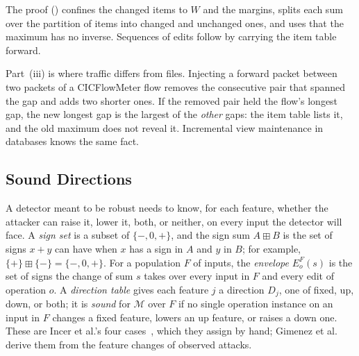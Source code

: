 \noindent The proof () confines the changed items to $W$ and the margins, splits each sum over the
partition of items into changed and unchanged ones, and uses that the maximum has no inverse. Sequences of edits
follow by carrying the item table forward.

Part~(iii) is where traffic differs from files. Injecting a forward packet between two packets of a CICFlowMeter flow
removes the consecutive pair that spanned the gap and adds two shorter ones. If the removed pair held the flow's
longest gap, the new longest gap is the largest of the \emph{other} gaps: the item table lists it, and the old maximum
does not reveal it. Incremental view maintenance in databases knows the same fact.

\subsection{Sound Directions}
\label{sec:fw:directions}

A detector meant to be robust needs to know, for each feature, whether the attacker can raise it, lower it, both, or
neither, on every input the detector will face. A \emph{sign set} is a subset of $\{-, 0, +\}$, and the sign sum
$A \boxplus B$ is the set of signs $x + y$ can have when $x$ has a sign in $A$ and $y$ in $B$; for example,
$\{+\} \boxplus \{-\} = \{-, 0, +\}$. For a population $F$ of inputs, the \emph{envelope} $E^F_o(s)$ is the set of
signs the change of sum $s$ takes over every input in $F$ and every edit of operation $o$. A \emph{direction table}
gives each feature $j$ a direction $D_j$, one of fixed, up, down, or both; it is \emph{sound} for $\mathcal{M}$ over
$F$ if no single operation instance on an input in $F$ changes a fixed feature, lowers an up feature, or raises a down
one. These are Incer et al.'s four cases~\cite{incer2018adversarially}, which they assign by hand; Gimenez et
al.~\cite{gimenez2025certifiably} derive them from the feature changes of observed attacks.

